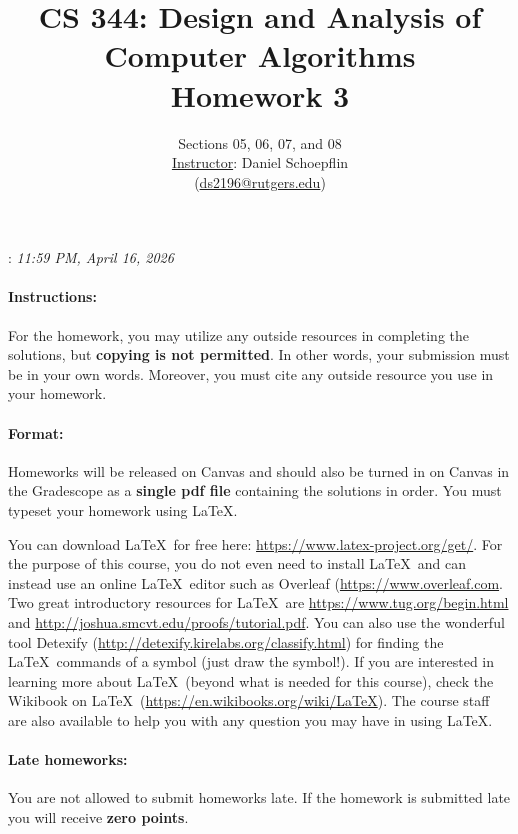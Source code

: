 \documentclass[10pt]{article}
\title{CS 344: Design and Analysis of Computer Algorithms\\
Homework 3}
\author{Sections 05, 06, 07, and 08\\
\underline{Instructor}: Daniel Schoepflin\\
(\url{ds2196@rutgers.edu})}
\date{}
\begin{document}
\maketitle
{: {\it 11:59 PM, April 16, 2026}


}

\paragraph{Instructions:} For the homework, you may utilize any outside resources in completing the solutions, but \textbf{copying is not permitted}.  In other words, your submission must be in your own words.  Moreover, you must cite any outside resource you use in your homework.

\paragraph{Format:} Homeworks will be released on Canvas and should also be turned in on Canvas in the Gradescope as a {\bf single pdf file} containing the solutions in order. You must typeset your homework using 
\LaTeX.   

You can download \LaTeX\ for free here: \url{https://www.latex-project.org/get/}. For the purpose of this course, you do not even need to install \LaTeX\ and 
can instead use an online \LaTeX\ editor such as Overleaf (\url{https://www.overleaf.com}.
Two great introductory resources for  \LaTeX\ are \url{https://www.tug.org/begin.html}  and \url{http://joshua.smcvt.edu/proofs/tutorial.pdf}. 
You can also use the wonderful tool Detexify (\url{http://detexify.kirelabs.org/classify.html})  for finding the
 \LaTeX\ commands of a symbol (just draw the symbol!).  
If you are interested in learning more about \LaTeX\ (beyond what is needed for this course), check the Wikibook on \LaTeX\ (\url{https://en.wikibooks.org/wiki/LaTeX}). 
The course staff are also available to help you with any question you may have in using \LaTeX.



\paragraph{Late homeworks:} You are not allowed to submit homeworks late.  If the homework is submitted late you will receive {\bf zero points}. 
\clearpage
\end{document}
